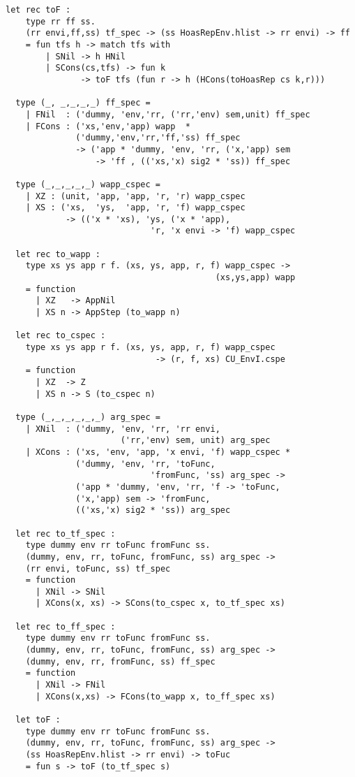 \documentclass[uplatex]{sumiilab-paper}
\theoremstyle{mystyle}
\numberwithin{definition}{chapter} %
\begin{document}
\begin{lstlisting}[caption=OCaml版EbUの実装,label=src:unembedding_ocaml]
  let rec toF : 
    type rr ff ss. 
    (rr envi,ff,ss) tf_spec -> (ss HoasRepEnv.hlist -> rr envi) -> ff
    = fun tfs h -> match tfs with
        | SNil -> h HNil 
        | SCons(cs,tfs) -> fun k 
               -> toF tfs (fun r -> h (HCons(toHoasRep cs k,r)))

  type (_, _,_,_,_) ff_spec = 
    | FNil  : ('dummy, 'env,'rr, ('rr,'env) sem,unit) ff_spec 
    | FCons : ('xs,'env,'app) wapp  * 
              ('dummy,'env,'rr,'ff,'ss) ff_spec 
              -> ('app * 'dummy, 'env, 'rr, ('x,'app) sem 
                  -> 'ff , (('xs,'x) sig2 * 'ss)) ff_spec
          
  type (_,_,_,_,_) wapp_cspec = 
    | XZ : (unit, 'app, 'app, 'r, 'r) wapp_cspec 
    | XS : ('xs,  'ys,  'app, 'r, 'f) wapp_cspec 
            -> (('x * 'xs), 'ys, ('x * 'app), 
                             'r, 'x envi -> 'f) wapp_cspec 
          
  let rec to_wapp : 
    type xs ys app r f. (xs, ys, app, r, f) wapp_cspec -> 
                                          (xs,ys,app) wapp
    = function
      | XZ   -> AppNil 
      | XS n -> AppStep (to_wapp n) 
          
  let rec to_cspec : 
    type xs ys app r f. (xs, ys, app, r, f) wapp_cspec 
                              -> (r, f, xs) CU_EnvI.cspe
    = function 
      | XZ  -> Z
      | XS n -> S (to_cspec n) 
          
  type (_,_,_,_,_,_) arg_spec =
    | XNil  : ('dummy, 'env, 'rr, 'rr envi, 
                       ('rr,'env) sem, unit) arg_spec 
    | XCons : ('xs, 'env, 'app, 'x envi, 'f) wapp_cspec * 
              ('dummy, 'env, 'rr, 'toFunc, 
                             'fromFunc, 'ss) arg_spec -> 
              ('app * 'dummy, 'env, 'rr, 'f -> 'toFunc, 
              ('x,'app) sem -> 'fromFunc, 
              (('xs,'x) sig2 * 'ss)) arg_spec 
          
  let rec to_tf_spec : 
    type dummy env rr toFunc fromFunc ss. 
    (dummy, env, rr, toFunc, fromFunc, ss) arg_spec -> 
    (rr envi, toFunc, ss) tf_spec 
    = function 
      | XNil -> SNil 
      | XCons(x, xs) -> SCons(to_cspec x, to_tf_spec xs) 
              
  let rec to_ff_spec : 
    type dummy env rr toFunc fromFunc ss. 
    (dummy, env, rr, toFunc, fromFunc, ss) arg_spec -> 
    (dummy, env, rr, fromFunc, ss) ff_spec 
    = function
      | XNil -> FNil 
      | XCons(x,xs) -> FCons(to_wapp x, to_ff_spec xs) 
          
  let toF : 
    type dummy env rr toFunc fromFunc ss. 
    (dummy, env, rr, toFunc, fromFunc, ss) arg_spec -> 
    (ss HoasRepEnv.hlist -> rr envi) -> toFuc 
    = fun s -> toF (to_tf_spec s)       
          

\end{lstlisting}
\end{document}
